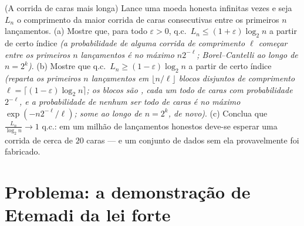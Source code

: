 \begin{exercise}[$\star\star$]\label{exo:b3:probability:12}
(A corrida de caras mais longa) Lance uma moeda honesta infinitas vezes
e seja $L_n$ o comprimento da maior corrida de caras consecutivas
entre os primeiros $n$ lançamentos.
(a) Mostre que, para todo $\varepsilon > 0$, q.c.\ $L_n \leq
(1 + \varepsilon)\log_2n$ a partir de certo índice
\emph{(a probabilidade de alguma corrida de comprimento $\ell$
começar entre os primeiros $n$ lançamentos é no máximo $n2^{-\ell}$;
Borel--Cantelli ao longo de $n =
2^k$)}.
(b) Mostre que q.c.\ $L_n \geq (1 - \varepsilon)\log_2n$ a partir de certo índice \emph{(reparta os
primeiros $n$ lançamentos em $\lfloor n/\ell\rfloor$ blocos disjuntos de comprimento
$\ell =
\lceil(1 - \varepsilon)\log_2n\rceil$; os blocos são , cada um todo de caras com
probabilidade $2^{-\ell}$, e a probabilidade de nenhum ser todo de caras é no
máximo $\exp(-n2^{-\ell}/\ell)$; some ao longo de $n = 2^k$, de novo)}.
(c) Conclua que $\frac{L_n}{\log_2n} \to 1$ q.c.: em um milhão de lançamentos honestos deve-se
esperar uma corrida de cerca de $20$ caras --- e um conjunto de dados
sem ela provavelmente foi fabricado.
\end{exercise}

\section{Problema: a demonstração de Etemadi da lei forte}

